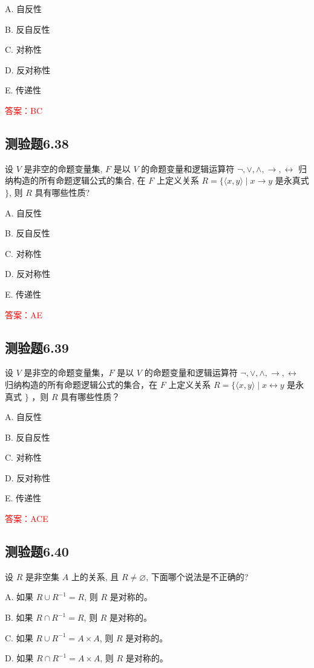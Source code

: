 \documentclass[UTF8, heading=true]{ctexart}
\begin{document}
A. 
自反性

B. 
反自反性

C. 
对称性

D. 
反对称性

E. 
传递性

\textcolor{red}{答案：BC}

\subsection{测验题6.38}

设 $V$ 是非空的命题变量集, $F$ 是以 $V$ 的命题变量和逻辑运算符 $\neg, \vee, \wedge, \rightarrow, \leftrightarrow$ 归纳构造的所有命题逻辑公式的集合, 在 $F$ 上定义关系 $R=\{\langle x, y\rangle \mid x \rightarrow y$ 是永真式 $\}$, 则 $R$ 具有哪些性质?

A. 自反性

B. 反自反性

C. 对称性

D. 反对称性

E. 传递性

\textcolor{red}{答案：AE}

\subsection{测验题6.39}


设 $V$ 是非空的命题变量集，$F$ 是以 $V$ 的命题变量和逻辑运算符 $\neg, \vee, \wedge, \rightarrow, \leftrightarrow$ 归纳构造的所有命题逻辑公式的集合，在 $F$ 上定义关系 $R=\{\langle x, y\rangle \mid x \leftrightarrow y$ 是永真式 $\}$ ，则 $R$ 具有哪些性质？

A. 自反性

B. 反自反性

C. 对称性

D. 反对称性

E. 传递性

\textcolor{red}{答案：ACE}

\subsection{测验题6.40}
设 $R$ 是非空集 $A$ 上的关系, 且 $R \neq \varnothing$, 下面哪个说法是不正确的?

A. 如果 $R \cup R^{-1}=R$, 则 $R$ 是对称的。

B. 如果 $R \cap R^{-1}=R$, 则 $R$ 是对称的。

C. 如果 $R \cup R^{-1}=A \times A$, 则 $R$ 是对称的。

D. 如果 $R \cap R^{-1}=A \times A$, 则 $R$ 是对称的。
\end{document}
